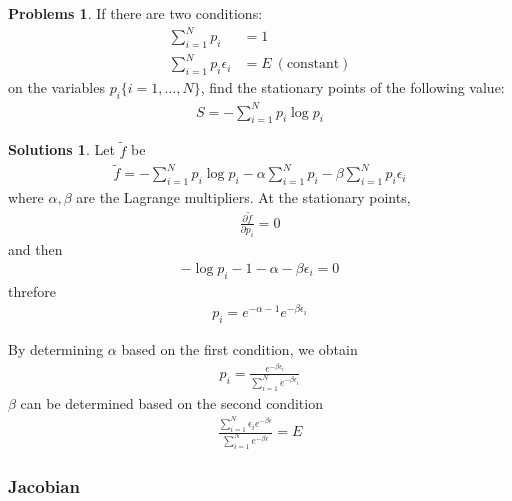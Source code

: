 \documentclass[draft]{article}
\theoremstyle{definition}
\newtheorem{problem}{Problems}[section]
\newtheorem{solution}{Solutions}[section]
\newcommand{\pardif}[2]{\frac{\partial #1}{\partial #2}}
\begin{document}
\begin{problem}
    If there are two conditions:
    \begin{align}
        \sum_{i=1}^Np_i&=1\\
        \sum_{i=1}^Np_i\epsilon_i&=E\ (\mathrm{constant})
    \end{align}
    on the variables $p_i \{i=1,\ldots,N\}$, find the stationary points of the following value:
    \begin{align}
        S=-\sum_{i=1}^Np_i\log p_i
    \end{align}
\end{problem}
\begin{solution}
    Let $\tilde{f}$ be 
    \begin{align}
        \tilde{f} = -\sum_{i=1}^Np_i\log p_i-\alpha\sum_{i=1}^Np_i -\beta\sum_{i=1}^Np_i\epsilon_i
    \end{align}
    where $\alpha, \beta$ are the Lagrange multipliers. At the stationary points,
    \begin{align}
        \pardif{\tilde{f}}{p_i} = 0
    \end{align}
    and then
    \begin{align}
        -\log p_i - 1 - \alpha -\beta\epsilon_i = 0
    \end{align}
    threfore
    \begin{align}
            p_i = e^{-\alpha - 1} e^{-\beta\epsilon_i}
    \end{align}

    By determining $\alpha$ based on the first condition, we obtain
    \begin{align}
        p_i = \frac{e^{-\beta\epsilon_i}}{\sum_{i=1}^Ne^{-\beta\epsilon_i}}
    \end{align}
    $\beta$ can be determined based on the second condition
    \begin{align}
        \frac{\sum_{i=1}^N\epsilon_ie^{-\beta\epsilon}}{\sum_{i=1}^Ne^{-\beta\epsilon}} = E
    \end{align}
\end{solution}   

\subsubsection{Jacobian}
\end{document}
